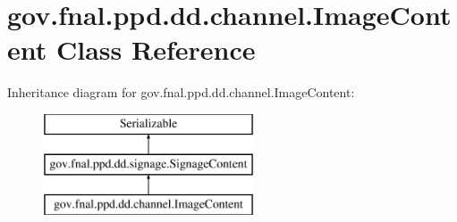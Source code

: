 \hypertarget{classgov_1_1fnal_1_1ppd_1_1dd_1_1channel_1_1ImageContent}{\section{gov.\-fnal.\-ppd.\-dd.\-channel.\-Image\-Content Class Reference}
\label{classgov_1_1fnal_1_1ppd_1_1dd_1_1channel_1_1ImageContent}
}
Inheritance diagram for gov.\-fnal.\-ppd.\-dd.\-channel.\-Image\-Content\-:\begin{figure}[H]
\begin{center}
\leavevmode
\includegraphics[height=3.000000cm]{classgov_1_1fnal_1_1ppd_1_1dd_1_1channel_1_1ImageContent}
\end{center}
\end{figure}

